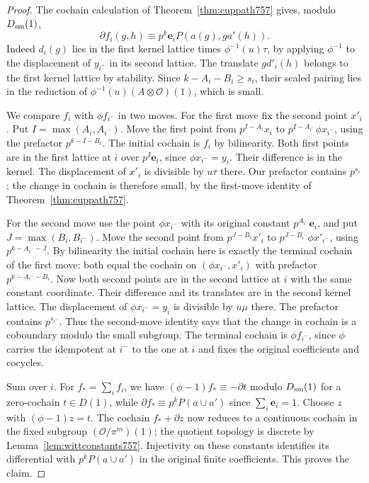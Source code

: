 \documentclass[a4paper,11pt]{article}
\theoremstyle{definition}
\theoremstyle{remark}
\numberwithin{equation}{section}
\begin{document}
\begin{proof}
The cochain calculation of Theorem~\ref{thm:cuppath757}
gives, modulo \(D_{\rm sm}(1)\),
\[
 \partial f_i(g,h)\equiv
       p^k\mathbf e_i P(a(g),g a'(h)).
\]
Indeed \(d_i(g)\) lies in the first kernel lattice times
\(\phi^{-1}(u)\tau\), by applying \(\phi^{-1}\) to the
displacement of \(y_{i^+}\) in its second lattice. The
translate \(g d'_i(h)\) belongs to the first kernel
lattice by stability. Since \(k-A_i-B_i\ge s_i\),
their scaled pairing lies in the reduction of
\(\phi^{-1}(u)(A\otimes\mathcal O)(1)\), which is small.

We compare \(f_i\) with \(\phi f_{i^-}\) in two moves.
For the first move fix the second point \(x'_i\). Put
\(I=\max(A_i,A_{i^-})\). Move the first point from
\(p^{I-A_i}x_i\) to \(p^{I-A_{i^-}}\phi x_{i^-}\),
using the prefactor \(p^{k-I-B_i}\). The initial cochain
is \(f_i\) by bilinearity. Both first points are in the
first lattice at \(i\) over \(p^I\mathbf e_i\), since
\(\phi x_{i^-}=y_i\). Their difference is in the kernel.
The displacement of \(x'_i\) is divisible by \(u\tau\)
there. Our prefactor contains \(p^{s_i}\); the change in
cochain is therefore small, by the first-move identity
of Theorem~\ref{thm:cuppath757}.

For the second move use the point \(\phi x_{i^-}\) with
its original constant \(p^{A_{i^-}}\mathbf e_i\), and
put \(J=\max(B_i,B_{i^-})\). Move the second point from
\(p^{J-B_i}x'_i\) to \(p^{J-B_{i^-}}\phi x'_{i^-}\),
using \(p^{k-A_{i^-}-J}\). By bilinearity the initial
cochain here is exactly the terminal cochain of the
first move: both equal the cochain on
\((\phi x_{i^-},x'_i)\) with prefactor
\(p^{k-A_{i^-}-B_i}\). Now both second points are in the
second lattice at \(i\) with the same constant coordinate.
Their difference and its translates are in the second
kernel lattice. The displacement of \(\phi x_{i^-}=y_i\)
is divisible by \(u\mu\) there. The prefactor contains
\(p^{s_{i^-}}\). Thus the second-move identity says that
the change in cochain is a coboundary modulo the small
subgroup. The terminal cochain is \(\phi f_{i^-}\), since
\(\phi\) carries the idempotent at \(i^-\) to the one at
\(i\) and fixes the original coefficients and cocycles.

Sum over \(i\). For \(f_*=\sum_i f_i\), we have
\((\phi-1)f_*\equiv-\partial t\) modulo \(D_{\rm sm}(1)\)
for a zero-cochain \(t\in D(1)\), while
\(\partial f_*\equiv p^k P(a\cup a')\) since
\(\sum_i\mathbf e_i=1\). Choose \(z\) with
\((\phi-1)z=t\). The cochain \(f_*+\partial z\) now
reduces to a continuous cochain in the fixed subgroup
\((\mathcal O/\pi^m)(1)\); the quotient topology is
discrete by Lemma~\ref{lem:wittconstants757}. Injectivity
on these constants identifies its differential with
\(p^kP(a\cup a')\) in the original finite coefficients.
This proves the claim.
\end{proof}
\end{document}
